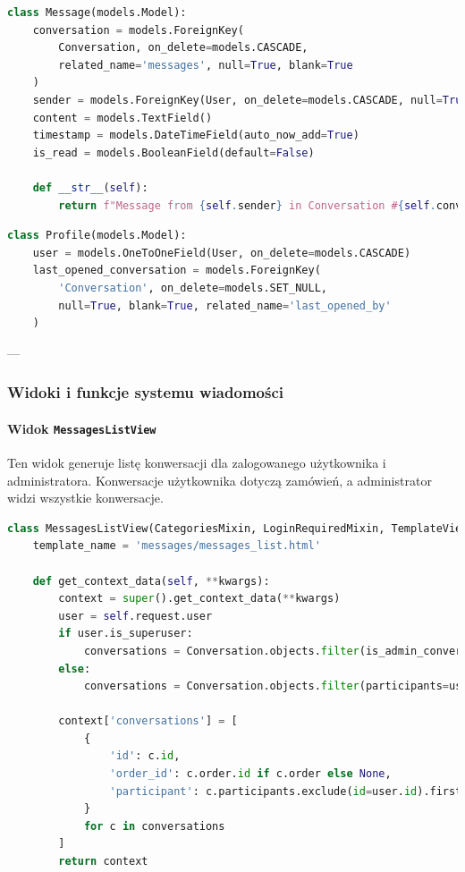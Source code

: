 \documentclass[12pt,a4paper,oneside]{article}
\theoremstyle{definition}
\numberwithin{equation}{section}
\begin{document}
\begin{lstlisting}[language=Python, caption=Model \texttt{Message}]
class Message(models.Model):
    conversation = models.ForeignKey(
        Conversation, on_delete=models.CASCADE,
        related_name='messages', null=True, blank=True
    )
    sender = models.ForeignKey(User, on_delete=models.CASCADE, null=True)
    content = models.TextField()
    timestamp = models.DateTimeField(auto_now_add=True)
    is_read = models.BooleanField(default=False)

    def __str__(self):
        return f"Message from {self.sender} in Conversation #{self.conversation.id}"
\end{lstlisting}

\begin{lstlisting}[language=Python, caption=Model \texttt{Profile}]
class Profile(models.Model):
    user = models.OneToOneField(User, on_delete=models.CASCADE)
    last_opened_conversation = models.ForeignKey(
        'Conversation', on_delete=models.SET_NULL,
        null=True, blank=True, related_name='last_opened_by'
    )
\end{lstlisting}

---

\subsubsection{Widoki i funkcje systemu wiadomości}

\paragraph{Widok \texttt{MessagesListView}}
Ten widok generuje listę konwersacji dla zalogowanego użytkownika i administratora. Konwersacje użytkownika dotyczą zamówień, a administrator widzi wszystkie konwersacje.

\begin{lstlisting}[language=Python, caption=Widok \texttt{MessagesListView}]
class MessagesListView(CategoriesMixin, LoginRequiredMixin, TemplateView):
    template_name = 'messages/messages_list.html'

    def get_context_data(self, **kwargs):
        context = super().get_context_data(**kwargs)
        user = self.request.user
        if user.is_superuser:
            conversations = Conversation.objects.filter(is_admin_conversation=False)
        else:
            conversations = Conversation.objects.filter(participants=user)

        context['conversations'] = [
            {
                'id': c.id,
                'order_id': c.order.id if c.order else None,
                'participant': c.participants.exclude(id=user.id).first().username if user.is_superuser else None
            }
            for c in conversations
        ]
        return context
\end{lstlisting}
\end{document}
